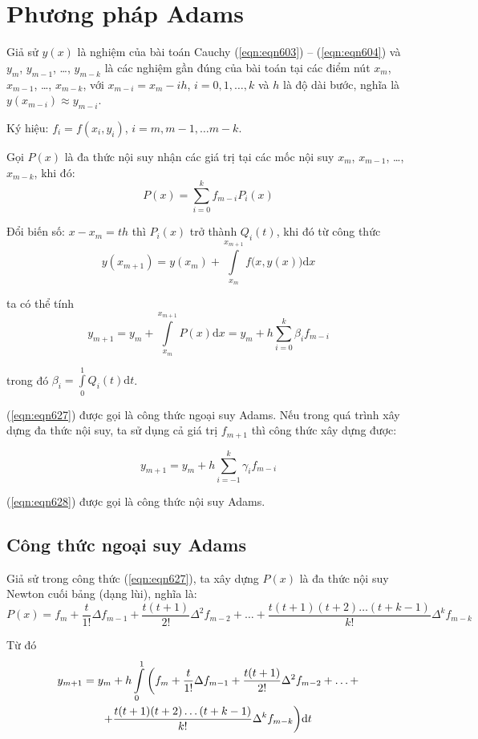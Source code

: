 \section{Phương pháp Adams}

Giả sử $y(x)$ là nghiệm của bài toán Cauchy (\ref{eqn:eqn603}) – (\ref{eqn:eqn604}) và $y_m$, $y_{m-1}$, \ldots, $y_{m-k}$ là các nghiệm gần đúng của bài toán tại các điểm nút $x_m$, $x_{m-1}$, \ldots, $x_{m-k}$, với $x_{m-i}=x_m-ih$, $i=0,1,\ldots,k$ và $h$ là độ dài bước, nghĩa là $y(x_{m-i})\approx y_{m-i}$.\par
Ký hiệu: $f_i=f(x_i,y_i)$, $i=m,m-1,\ldots m-k$.\par

Gọi $P(x)$ là đa thức nội suy nhận các giá trị tại các mốc nội suy $x_m$, $x_{m-1}$, \ldots, $x_{m-k}$, khi đó:
$$P(x)=\sum\limits_{i=0}^{k}f_{m-i}P_{i}(x)$$

Đổi biến số: $x-x_m=th$ thì $P_i(x)$ trở thành $Q_i(t)$, khi đó từ công thức
$$y\left(x_{m+1}\right)= y(x_m) + \int\limits_{x_m}^{x_{m+1}} f\big(x, y(x)\big)\mathrm{d}x$$

ta có thể tính
\begin{equation}\label{eqn:eqn627}
	y_{m+1}=y_m+\int\limits_{x_m}^{x_{m+1}} P(x)\mathrm{d}x=y_m+h\sum\limits_{i=0}^{k}\beta_i f_{m-i}
\end{equation}

trong đó $\beta_i=\int\limits_0^1Q_i(t)\mathrm{d}t$.

(\ref{eqn:eqn627}) được gọi là công thức ngoại suy Adams. Nếu trong quá trình xây dựng đa thức nội suy, ta sử dụng cả giá trị $f_{m+1}$ thì công thức xây dựng được:

\begin{equation}\label{eqn:eqn628}
	y_{m+1}=y_m+h\sum\limits_{i=-1}^{k}\gamma_i f_{m-i}
\end{equation}

(\ref{eqn:eqn628}) được gọi là công thức nội suy Adams.

\subsection{Công thức ngoại suy Adams}

Giả sử trong công thức (\ref{eqn:eqn627}), ta xây dựng $P(x)$ là đa thức nội suy Newton cuối bảng (dạng lùi), nghĩa là:
$$P(x)=f_m+\frac{t}{1!}\Delta f_{m-1}+\frac{t(t+1)}{2!}\Delta^2 f_{m-2}+\ldots+\frac{t(t+1)(t+2)\ldots (t+k-1)}{k!}\Delta^k f_{m-k}$$

Từ đó
\begin{multline*}
	y_{m+1}=y_m+h\int\limits_0^1\bigg(f_m+\frac{t}{1!}\Delta f_{m-1}+\frac{t(t+1)}{2!}\Delta^2 f_{m-2}+\ldots+\\
	+\frac{t(t+1)(t+2)\ldots (t+k-1)}{k!}\Delta^k f_{m-k}\bigg)\mathrm{d}t$$
\end{multline*}

